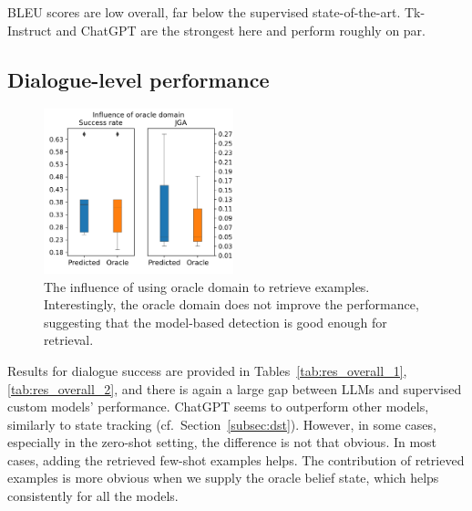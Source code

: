 BLEU scores are low overall, far below the supervised state-of-the-art. Tk-Instruct and ChatGPT are the strongest here and perform roughly on par.

\subsection{Dialogue-level performance}
\label{07:sec:dialogue-performance}
\begin{figure}[t]
    \centering
    \includegraphics[width=0.49\textwidth]{images/oracle_domains.png}
    \caption{The influence of using oracle domain to retrieve examples. Interestingly, the oracle domain does not improve the performance, suggesting that the model-based detection is good enough for retrieval.}
    \label{07:fig:oracle_domains}
\end{figure}
Results for dialogue success are provided in Tables~\ref{tab:res_overall_1},\ref{tab:res_overall_2}, and there is again a large gap between LLMs and supervised custom models' performance.
ChatGPT seems to outperform other models, similarly to state tracking (cf.~Section~\ref{subsec:dst}).
However, in some cases, especially in the zero-shot setting, the difference is not that obvious.
In most cases, adding the retrieved few-shot examples helps.
The contribution of retrieved examples is more obvious when we supply the oracle belief state, which helps consistently for all the models.

